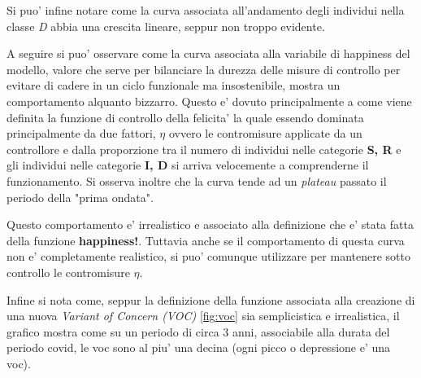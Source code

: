 Si puo' infine notare come la curva associata all'andamento degli individui
nella classe \emph{D} abbia una crescita lineare, seppur non troppo evidente.

A seguire si puo' osservare come la curva associata alla variabile di happiness del modello,
valore che serve per bilanciare la durezza delle misure di controllo per evitare 
di cadere in un ciclo funzionale ma insostenibile, mostra un comportamento alquanto bizzarro.
Questo e' dovuto principalmente a come viene definita la funzione di controllo della felicita' 
la quale essendo dominata principalmente da due fattori, $\eta$ ovvero le contromisure applicate
da un controllore e dalla proporzione tra il numero di individui nelle categorie \textbf{S, R} e 
gli individui nelle categorie \textbf{I, D} si arriva velocemente a comprenderne il funzionamento.
Si osserva inoltre che la curva tende ad un \emph{plateau} passato il periodo della "prima ondata". 

Questo comportamento e' irrealistico e associato alla definizione che e' stata fatta della 
funzione \textbf{happiness!}. Tuttavia anche se il comportamento di questa curva non e' 
completamente realistico, si puo' comunque utilizzare per mantenere sotto controllo le contromisure $\eta$.

Infine si nota come, seppur la definizione della funzione associata alla creazione di una
nuova \emph{Variant of Concern (VOC)} \ref{fig:voc} sia semplicistica e irrealistica, 
il grafico mostra come su un periodo di circa 3 anni, associabile alla durata del periodo covid, 
le voc sono al piu' una decina (ogni picco o depressione e' una voc). 

